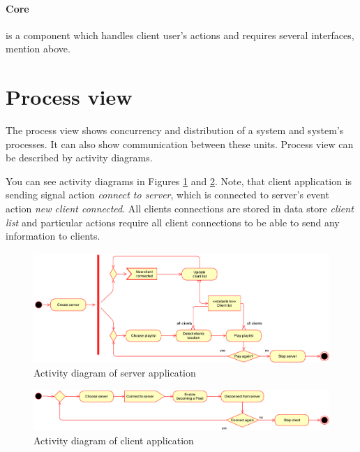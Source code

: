 \paragraph{Core} is a component which handles client user's actions and requires several interfaces, mention above.

\section{Process view}
The process view shows concurrency and distribution of a system and system's processes.
It can also show communication between these units.
Process view can be described by activity diagrams.

You can see activity diagrams in Figures \ref{fig:activity_diagram_server} and \ref{fig:activity_diagram_client}. Note, that client application is sending signal action \emph{connect to server}, which is connected to server's event action \emph{new client connected}. 
 All clients connections are stored in data store \emph{client list} and particular actions require all client connections to be able to send any information to clients.

\begin{figure}[h]
	\centering
		\includegraphics[width=16.2cm]{softwareArchitecture/activity_server.pdf}
	\caption{Activity diagram of server application}
	\label{fig:activity_diagram_server}
\end{figure}

\begin{figure}[h]
	\centering
		\includegraphics[width=16.2cm]{softwareArchitecture/activity_client.pdf}
	\caption{Activity diagram of client application}
	\label{fig:activity_diagram_client}
\end{figure}


